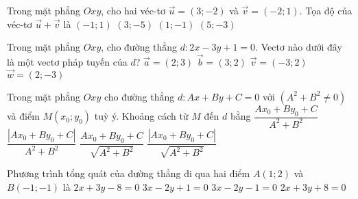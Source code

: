 \begin{ex}%
	Trong mặt phẳng $Oxy$, cho hai véc-tơ $\overrightarrow{u} = (3;-2)$ và $\overrightarrow{v} = (-2;1)$. Tọa độ của véc-tơ $\overrightarrow{u} + \overrightarrow{v}$ là 
	\choice
	{$(-1;1)$}
	{$(3;-5)$}
	{\True $(1;-1)$}
	{$(5;-3)$}
\end{ex}


\begin{ex}%
	Trong mặt phẳng $Oxy$, cho đường thẳng $d\colon 2x-3y+1=0$. Vectơ nào dưới đây là một vectơ pháp tuyến của $d$?
	\choice
	{$\vec a=\left(2;3\right)$}
	{$\vec b=\left(3;2\right)$}
	{ $\vec v=\left(-3;2\right)$}
	{\True $\vec w=\left(2;-3\right)$}
\end{ex}
\begin{ex}%
	Trong mặt phẳng $Oxy$ cho đường thẳng $d\colon Ax+By+C=0$ với $\left(A^2+B^2\neq 0\right)$ và điểm $M\left(x_0;y_0\right)$ tuỳ ý. Khoảng cách từ $M$ đến $d$ bằng
	\choice
	{$\dfrac{Ax_0+By_0+C}{{A^2+B^2}}$}
	{$\dfrac{\left|Ax_0+By_0+C\right|}{A^2+B^2}$}
	{$\dfrac{Ax_0+By_0+C}{\sqrt{A^2+B^2}}$}
	{\True $ \dfrac{\left|Ax_0+By_0+C\right|}{\sqrt {A^2+B^2}}$}
\end{ex}
\begin{ex}%
	Phương trình tổng quát của đường thẳng đi qua hai điểm $A\left(1;2\right)$ và $B\left(-1;-1\right)$ là
	\choice
	{\True$2x+3y-8=0$}
	{$3x-2y+1=0$}
	{$3x-2y-1=0$}
	{ $2x+3y+8=0$}
\end{ex}

